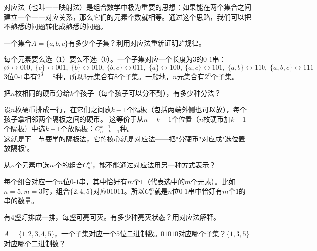 
对应法（也叫一一映射法）是组合数学中极为重要的思想：如果能在两个集合之间建立一个一一对应关系，那么它们的元素个数就相等。通过这个思路，我们可以把不熟悉的问题转化成熟悉的问题。

\begin{example}
一个集合$A=\{a,b,c\}$有多少个子集？利用对应法重新证明$2^n$规律。
\end{example}
\begin{solution}
每个元素要么选（$1$）要么不选（$0$）。一个子集对应一个长度为$3$的$0$-$1$串：
\[
\varnothing \leftrightarrow 000,\;
\{c\} \leftrightarrow 001,\;
\{b\} \leftrightarrow 010,\;
\{b,c\} \leftrightarrow 011,\;
\{a\} \leftrightarrow 100,\;
\{a,c\} \leftrightarrow 101,\;
\{a,b\} \leftrightarrow 110,\;
\{a,b,c\} \leftrightarrow 111
\]
$3$位$0$-$1$串有$2^3=8$种，所以$3$元集合有$8$个子集。一般地，$n$元集合有$2^n$个子集。
\end{solution}

\begin{example}
把$n$枚相同的硬币分给$k$个孩子（每个孩子可以分不到），有多少种分法？
\end{example}
\begin{solution}
设$n$枚硬币排成一行，在它们之间放$k-1$个隔板（包括两端外侧也可以放），每个孩子拿相邻两个隔板之间的硬币。
这等价于从$n+k-1$个位置（$n$枚硬币加$k-1$个隔板）中选$k-1$个放隔板：$C_{n+k-1}^{k-1}$种。\\
这就是下一节要学的隔板法，它的核心就是对应法——把"分硬币"对应成"选位置放隔板"。
\end{solution}

\begin{example}
从$n$个元素中选$m$个的组合$C_n^m$，能不能通过对应法用另一种方式表示？
\end{example}
\begin{solution}
每个组合对应一个$n$位$0$-$1$串，其中恰好有$m$个$1$（代表选中的$m$个元素）。比如$n=5,m=3$时，组合$\{2,4,5\}$对应$01011$。所以$C_n^m$就是$n$位$0$-$1$串中恰好有$m$个$1$的串的数量。
\end{solution}

\begin{exercise}
\item 有$4$盏灯排成一排，每盏可亮可灭。有多少种亮灭状态？用对应法解释。
\item $A=\{1,2,3,4,5\}$，一个子集对应一个$5$位二进制数。$01010$对应哪个子集？$\{1,3,5\}$对应哪个二进制数？
\end{exercise}

